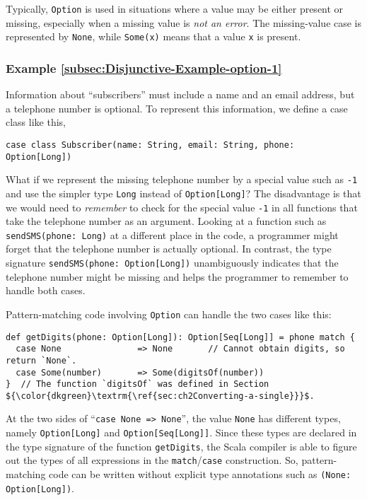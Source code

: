Typically, \lstinline!Option! is used in situations where a value
may be either present or missing, especially when a missing value
is \emph{not an error}. The missing-value case is represented by \lstinline!None!,
while \lstinline!Some(x)! means that a value \lstinline!x! is present.

\subsubsection{Example \label{subsec:Disjunctive-Example-option-1}\ref{subsec:Disjunctive-Example-option-1}}

Information about ``subscribers'' must include a name and an email
address, but a telephone number is optional. To represent this information,
we define a case class like this,
\begin{lstlisting}
case class Subscriber(name: String, email: String, phone: Option[Long])
\end{lstlisting}
What if we represent the missing telephone number by a special value
such as \lstinline!-1! and use the simpler type \lstinline!Long!
instead of \lstinline!Option[Long]!? The disadvantage is that we
would need to \emph{remember} to check for the special value \lstinline!-1!
in all functions that take the telephone number as an argument. Looking
at a function such as \lstinline!sendSMS(phone: Long)! at a different
place in the code, a programmer might forget that the telephone number
is actually optional. In contrast, the type signature \lstinline!sendSMS(phone: Option[Long])!
unambiguously indicates that the telephone number might be missing
and helps the programmer to remember to handle both cases.

Pattern-matching code involving \lstinline!Option! can handle the
two cases like this:
\begin{lstlisting}[mathescape=true]
def getDigits(phone: Option[Long]): Option[Seq[Long]] = phone match {
  case None               => None       // Cannot obtain digits, so return `None`.
  case Some(number)       => Some(digitsOf(number))
}  // The function `digitsOf` was defined in Section ${\color{dkgreen}\textrm{\ref{sec:ch2Converting-a-single}}}$.
\end{lstlisting}

At the two sides of ``\lstinline!case None => None!'', the value
\lstinline!None! has different types, namely \lstinline!Option[Long]!
and \lstinline!Option[Seq[Long]]!. Since these types are declared
in the type signature of the function \lstinline!getDigits!, the
Scala compiler is able to figure out the types of all expressions
in the \lstinline!match!/\lstinline!case! construction. So, pattern-matching
code can be written without explicit type annotations
such as \lstinline!(None: Option[Long])!.

